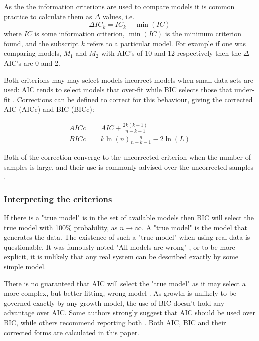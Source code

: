 \documentclass[12pt,a4paper]{article}
\begin{document}
	As the the information criterions are used to compare models it is common practice to calculate them as $\Delta$ values, i.e.
	\begin{equation}
	\Delta IC_k = IC_k - \min(IC) 
	\end{equation}
	where $IC$ is some information criterion, $\min(IC)$ is the minimum criterion found, and the subscript $k$ refers to a particular model. For example if one was comparing models, $M_1$ and $M_2$ with AIC's of 10 and 12 respectively then the $\Delta$AIC's are 0 and 2. 
	
	Both criterions may may select models incorrect models when small data sets are used: AIC tends to select models that over-fit while BIC selects those that under-fit \parencite{Hurvich1989,McQuarrie1999}. Corrections can be defined to correct for this behaviour, giving the corrected AIC (AICc) and BIC (BICc):
	
	\begin{align}
		AICc &= AIC + \frac{2k(k+1)}{n-k-1}\\
		BICc &= k\ln(n)\frac{n}{n-k-1} - 2\ln (L) 
	\end{align}
	
	Both of the correction converge to the uncorrected criterion when the number of samples is large, and their use is commonly advised over the uncorrected samples \parencite{Burnham2002}.
	\subsubsection{Interpreting the criterions}
	
	
	If there is a "true model" is in the set of available models then BIC will select the true model with 100\% probability, as  $n \rightarrow \infty$. A "true model" is the model that generates the data. The existence of such a "true model" when using real data is questionable. It was famously noted "All models are wrong" \parencite{Box1976}, or to be more explicit, it is unlikely that any real system can be described exactly by some simple model.
	
	There is no guaranteed that AIC will select the "true model" as it may select a more complex, but better fitting, wrong model \parencite{Burnham2002}. As growth is unlikely to be governed exactly by any growth model, the use of BIC doesn't hold any advantage over AIC. Some authors strongly suggest that AIC should be used over BIC, while others recommend reporting both \parencite{Burnham2011,AndrewH.2013}. Both AIC, BIC and their corrected forms are calculated in this paper.
	
\end{document}
